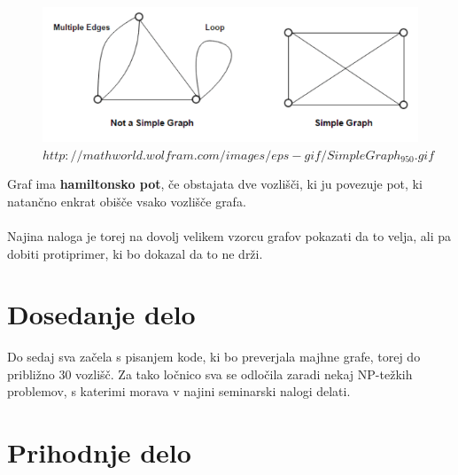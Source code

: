 \documentclass[12pt,a4paper]{amsart}
\begin{document}
\begin{figure}[h!]
	\centering
	\includegraphics[scale=1]{slike/graf1}
	\caption{$http://mathworld.wolfram.com/images/eps-gif/SimpleGraph_950.gif$}
\end{figure}
Graf ima \textbf{hamiltonsko pot}, če obstajata dve vozlišči, ki ju povezuje pot, ki natančno enkrat obišče vsako vozlišče grafa.\\
\ \\
Najina naloga je torej na dovolj velikem vzorcu grafov pokazati da to velja, ali pa dobiti protiprimer, ki bo dokazal da to ne drži.\\
\section{Dosedanje delo}
Do sedaj sva začela s pisanjem kode, ki bo preverjala majhne grafe, torej do približno $30$ vozlišč. Za tako ločnico sva se odločila zaradi nekaj NP-težkih problemov, s katerimi morava v najini seminarski nalogi delati.  
\section{Prihodnje delo}
\end{document}
